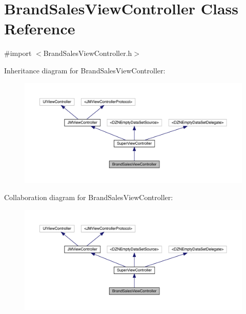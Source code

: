 \hypertarget{interface_brand_sales_view_controller}{}\section{Brand\+Sales\+View\+Controller Class Reference}
\label{interface_brand_sales_view_controller}


{\ttfamily \#import $<$Brand\+Sales\+View\+Controller.\+h$>$}



Inheritance diagram for Brand\+Sales\+View\+Controller\+:\nopagebreak
\begin{figure}[H]
\begin{center}
\leavevmode
\includegraphics[width=350pt]{interface_brand_sales_view_controller__inherit__graph}
\end{center}
\end{figure}


Collaboration diagram for Brand\+Sales\+View\+Controller\+:\nopagebreak
\begin{figure}[H]
\begin{center}
\leavevmode
\includegraphics[width=350pt]{interface_brand_sales_view_controller__coll__graph}
\end{center}
\end{figure}
